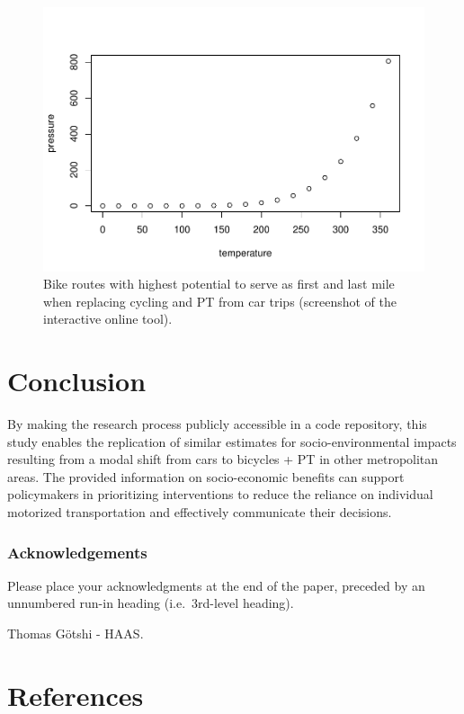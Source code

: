 \documentclass[runningheads]{llncs}
\begin{document}
\begin{figure}
\includegraphics{PaperTRA_files/figure-latex/map2-1} \caption{Bike routes with highest potential to serve as first and last mile when replacing cycling and PT from car trips (screenshot of the interactive online tool).}\label{fig:map2}
\end{figure}

\hypertarget{conclusion}{%
\section{Conclusion}\label{conclusion}}

By making the research process publicly accessible in a code repository,
this study enables the replication of similar estimates for
socio-environmental impacts resulting from a modal shift from cars to
bicycles + PT in other metropolitan areas. The provided information on
socio-economic benefits can support policymakers in prioritizing
interventions to reduce the reliance on individual motorized
transportation and effectively communicate their decisions.

\hypertarget{acknowledgements}{%
\subsubsection*{Acknowledgements}\label{acknowledgements}}

Please place your acknowledgments at the end of the paper, preceded by
an unnumbered run-in heading (i.e.~3rd-level heading).

Thomas Götshi - HAAS.

\hypertarget{references}{%
\section*{References}\label{references}}
\end{document}
